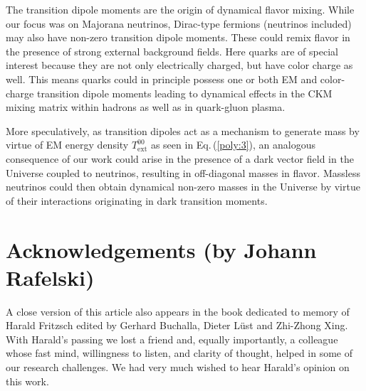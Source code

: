 \documentclass{ws-ijmpa}
\newcommand{\req}[1]{Eq.\,(\ref{#1})}
\begin{document}
The transition dipole moments are the origin of dynamical flavor mixing. While our focus was on Majorana neutrinos, Dirac-type fermions (neutrinos included) may also have non-zero transition  dipole moments. These could  remix flavor in the presence of strong external background fields. Here  quarks  are of special interest because they are not only electrically charged, but have color charge as well. This means quarks could in principle possess one or both EM and color-charge transition dipole moments leading to dynamical effects in the CKM mixing matrix within hadrons as well as in quark-gluon plasma.

More speculatively, as transition dipoles act as a mechanism to generate mass by virtue of EM energy density $T_\mathrm{ext}^{00}$ as seen in \req{poly:3}, an analogous consequence of our work could arise in the presence of a dark vector field in the Universe coupled to neutrinos, resulting in off-diagonal masses in flavor. Massless neutrinos could then obtain dynamical non-zero masses in the Universe by virtue of their interactions originating in dark transition moments.

\section*{Acknowledgements (by Johann Rafelski)}
\label{sec:acknowledgements}
A close version of this article also appears in the book dedicated to memory of Harald Fritzsch edited by Gerhard Buchalla, Dieter L\"ust and Zhi-Zhong Xing. With Harald's passing we lost a friend  and, equally importantly, a colleague whose fast mind, willingness to listen, and clarity of thought, helped in some of our research challenges. We had very much wished to hear Harald's opinion on this work.


%

\end{document}
